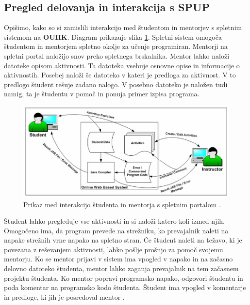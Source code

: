 \subsection{Pregled delovanja in interakcija s SPUP}
\label{sec:pregled_delovanja_in_interakcija}

Opišimo, kako so si zamislili interakcijo med študentom in mentorjev s
spletnim sistemom na \textbf{OUHK}. Diagram prikazuje slika
\ref{fig:OUHK_workFlow}. Spletni sistem omogoča študentom in mentorjem
spletno okolje za učenje programiran. Mentorji na spletni portal
naložijo snov preko spletnega brskalnika. Mentor lahko naloži datoteke
opisom aktivnosti. Ta datoteka vsebuje osnovne opise in informacije o
aktivnostih. Posebej naloži še datoteko v kateri je predloga za
aktivnost. V to predlogo študent rešuje zadano nalogo. V posebno
datoteko je naložen tudi namig, ta je študentu v pomoč in ponuja
primer izpisa programa.
\begin{figure}[htb!] \centering
  \includegraphics[width=0.9\linewidth, keepaspectratio =
1]{./images/SystemArch02_OUHK_DistanceEdu.jpg}
\caption{Prikaz med interakcijo študenta in mentorja s spletnim
  portalom \cite{ITaLCP_DistanceEdu}.}
  \label{fig:OUHK_workFlow}
\end{figure}

Študent lahko pregleduje vse aktivnosti in si naloži katero koli izmed
njih. Omogočeno ima, da program prevede na strežniku, ko prevajalnik
naleti na napake strežnih vrne napako na spletno stran. Če študent
naleti na težavo, ki je povezana z reševanjem aktivnosti, lahko pošlje
prošnjo za pomoč svojemu mentorju. Ko se mentor prijavi v sistem ima
vpogled v napako in na začasno delovno datoteko študenta, mentor lahko
zaganja prevajalnik na tem začasnem projektu študenta. Ko mentor
popravi programsko napako, odgovori študentu in poda komentar na
programsko kodo študenta. Študent ima vpogled v komentarje in
predloge, ki jih je posredoval mentor \cite{ITaLCP_DistanceEdu}.

